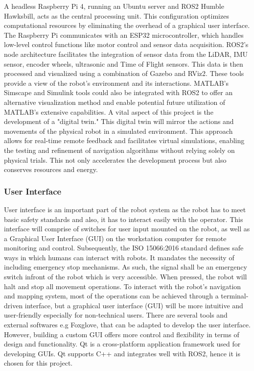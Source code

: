 \noindent A headless Raspberry Pi 4, running an Ubuntu server and ROS2 Humble Hawksbill, acts as the central processing unit. This configuration optimizes computational resources by eliminating the overhead of a graphical user interface. The Raspberry Pi communicates with an ESP32 microcontroller, which handles low-level control functions like motor control and sensor data acquisition.
ROS2's node architecture facilitates the integration of sensor data from the LiDAR, IMU sensor, encoder wheels, ultrasonic and Time of Flight sensors. This data is then processed and visualized using a combination of Gazebo and RViz2. These tools provide a view of the robot's environment and its interactions. MATLAB's Simscape and Simulink tools could also be integrated with ROS2 to offer an alternative visualization method and enable potential future utilization of MATLAB's extensive capabilities.
A vital aspect of this project is the development of a "digital twin." This digital twin will mirror the actions and movements of the physical robot in a simulated environment. This approach allows for real-time remote feedback and facilitates virtual simulations, enabling the testing and refinement of navigation algorithms without relying solely on physical trials. This not only accelerates the development process but also conserves resources and energy.





\subsubsection{User Interface} 
User interface is an important part of the robot system as the robot has to meet basic safety standards and also, it has
to interact easily with the operator. This interface will comprise of switches for user input mounted on the robot, as well as
a Graphical User Interface (GUI) on the workstation computer for remote monitoring and control. Subsequently, the ISO 15066:2016 standard defines safe ways in which 
humans can interact with robots. It mandates the necessity of including emergency stop mechanisms. As such, the signal shall be an emergency switch infront of the robot
which is very accessible. When pressed, the robot will halt and stop all movement operations. To interact with the robot's navigation 
and mapping system, most of the
operations can be achieved through a terminal-driven interface, but a graphical user interface (GUI) will be more
intuitive and user-friendly especially for non-technical users. There are several tools and external softwares
e.g Foxglove, that can be adapted to develop the user interface. However, building a custom GUI offers more control
and flexibility in terms of design and functionality. Qt is a cross-platform application framework used for developing
GUIs. Qt supports C++ and integrates well with ROS2, hence it is chosen for this project. 

